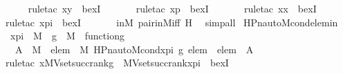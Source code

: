 \begin{isabellebody}
\ \ \ \ \isamarkupfalse%
\ {\isacharparenleft}{\kern0pt}rule{\isacharunderscore}{\kern0pt}tac\ x{\isacharequal}{\kern0pt}{\isachardoublequoteopen}y{\isachardoublequoteclose}\ \ bexI{\isacharparenright}{\kern0pt}\ \isanewline
\ \ \ \ \isamarkupfalse%
\ {\isacharparenleft}{\kern0pt}rule{\isacharunderscore}{\kern0pt}tac\ x{\isacharequal}{\kern0pt}{\isachardoublequoteopen}p{\isachardoublequoteclose}\ \ bexI{\isacharparenright}{\kern0pt}\ \isanewline
\ \ \ \ \isamarkupfalse%
\ {\isacharparenleft}{\kern0pt}rule{\isacharunderscore}{\kern0pt}tac\ x{\isacharequal}{\kern0pt}{\isachardoublequoteopen}x{\isachardoublequoteclose}\ \ bexI{\isacharparenright}{\kern0pt}\ \isanewline
\ \ \ \ \isamarkupfalse%
\ {\isacharparenleft}{\kern0pt}rule{\isacharunderscore}{\kern0pt}tac\ x{\isacharequal}{\kern0pt}{\isachardoublequoteopen}pi{\isachardoublequoteclose}\ \ bexI{\isacharparenright}{\kern0pt}\ \isanewline
\ \ \ \ \isamarkupfalse%
\ inM\ pair{\isacharunderscore}{\kern0pt}in{\isacharunderscore}{\kern0pt}M{\isacharunderscore}{\kern0pt}iff\ H\ \isamarkupfalse%
\ simp{\isacharunderscore}{\kern0pt}all\isanewline
{}\isamarkupfalse%
%
\endisatagproof
{\isafoldproof}%
%
\isadelimproof
\isanewline
%
\endisadelimproof
\isanewline
{}\isamarkupfalse%
\ HPn{\isacharunderscore}{\kern0pt}auto{\isacharunderscore}{\kern0pt}M{\isacharunderscore}{\kern0pt}cond{\isacharunderscore}{\kern0pt}elem{\isacharunderscore}{\kern0pt}in\ {\isacharcolon}{\kern0pt}\ \isanewline
\ \ {\isachardoublequoteopen}x{\isacharunderscore}{\kern0pt}pi\ {\isasymin}\ M\ {\isasymLongrightarrow}\ g\ {\isasymin}\ M\ {\isasymLongrightarrow}\ function{\isacharparenleft}{\kern0pt}g{\isacharparenright}{\kern0pt}\ {\isasymLongrightarrow}\ \isanewline
\ \ \ {\isasymexists}A\ {\isasymin}\ M{\isachardot}{\kern0pt}\ {\isasymforall}\ elem\ {\isasymin}\ M{\isachardot}{\kern0pt}\ HPn{\isacharunderscore}{\kern0pt}auto{\isacharunderscore}{\kern0pt}M{\isacharunderscore}{\kern0pt}cond{\isacharparenleft}{\kern0pt}x{\isacharunderscore}{\kern0pt}pi{\isacharcomma}{\kern0pt}\ g{\isacharcomma}{\kern0pt}\ elem{\isacharparenright}{\kern0pt}\ {\isasymlongrightarrow}\ elem\ {\isasymin}\ A{\isachardoublequoteclose}\ \isanewline
%
\isadelimproof
\ \ %
\endisadelimproof
%
\isatagproof
{}\isamarkupfalse%
\ {\isacharparenleft}{\kern0pt}rule{\isacharunderscore}{\kern0pt}tac\ x{\isacharequal}{\kern0pt}{\isachardoublequoteopen}MVset{\isacharparenleft}{\kern0pt}succ{\isacharparenleft}{\kern0pt}rank{\isacharparenleft}{\kern0pt}g{\isacharparenright}{\kern0pt}{\isacharparenright}{\kern0pt}{\isacharparenright}{\kern0pt}\ {\isasymtimes}\ MVset{\isacharparenleft}{\kern0pt}succ{\isacharparenleft}{\kern0pt}rank{\isacharparenleft}{\kern0pt}x{\isacharunderscore}{\kern0pt}pi{\isacharparenright}{\kern0pt}{\isacharparenright}{\kern0pt}{\isacharparenright}{\kern0pt}{\isachardoublequoteclose}\ \ bexI{\isacharparenright}{\kern0pt}\ \isanewline

\end{isabellebody}
